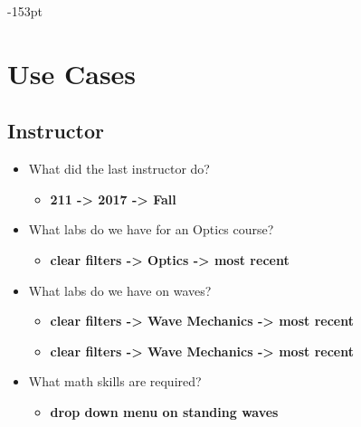\begin{adjustwidth}{}{-153pt}
\section{\bf Use Cases}

\subsection{\bf Instructor}
\begin{itemize}
\item What did the last instructor do?
\begin{itemize} \item {\bf 211 -> 2017 -> Fall}  \end{itemize}
\item What labs do we have for an Optics course?
\begin{itemize} \item {\bf clear filters -> Optics -> most recent}  \end{itemize}
\item What labs do we have on waves? 
\begin{itemize} \item {\bf clear filters -> Wave Mechanics -> most recent}  \end{itemize}
\begin{itemize} \item {\bf clear filters -> Wave Mechanics -> most recent}  \end{itemize}
\item What math skills are required?
\begin{itemize} \item {\bf drop down menu on standing waves}  \end{itemize}
\end{itemize}


\end{adjustwidth}
